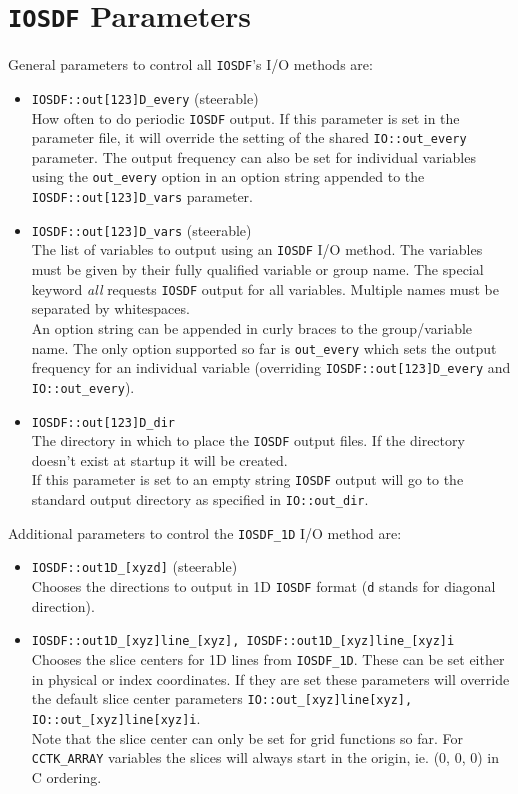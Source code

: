 \documentclass{article}
\begin{document}
\section{{\tt IOSDF} Parameters}
%
General parameters to control all {\tt IOSDF}'s I/O methods are:
\begin{itemize}
  \item {\tt IOSDF::out[123]D\_every} (steerable)\\
        How often to do periodic {\tt IOSDF} output. If this parameter is set in the
        parameter file, it will override the setting of the shared
        {\tt IO::out\_every} parameter. The output frequency can also be set
        for individual variables using the {\tt out\_every} option in an option string appended to the {\tt IOSDF::out[123]D\_vars} parameter.
  \item {\tt IOSDF::out[123]D\_vars} (steerable)\\
        The list of variables to output using an {\tt IOSDF} I/O method.
        The variables must be given by their fully qualified variable or group
        name. The special keyword {\it all} requests {\tt IOSDF} output for
        all variables. Multiple names must be separated by whitespaces.\\
        An option string can be appended in curly braces to the
        group/variable name. The only option supported so far is {\tt out\_every}
        which sets the output frequency for an individual variable (overriding
        {\tt IOSDF::out[123]D\_every} and {\tt IO::out\_every}).
  \item {\tt IOSDF::out[123]D\_dir}\\
        The directory in which to place the {\tt IOSDF} output files.
        If the directory doesn't exist at startup it will be created.\\
        If this parameter is set to an empty string {\tt IOSDF} output will go
        to the standard output directory as specified in {\tt IO::out\_dir}.
\end{itemize}
%
Additional parameters to control the {\tt IOSDF\_1D} I/O method are:
\begin{itemize}
  \item {\tt IOSDF::out1D\_[xyzd]} (steerable)\\
        Chooses the directions to output in 1D {\tt IOSDF} format ({\tt d}
        stands for diagonal direction).
  \item {\tt IOSDF::out1D\_[xyz]line\_[xyz], IOSDF::out1D\_[xyz]line\_[xyz]i}\\
        Chooses the slice centers for 1D lines from {\tt IOSDF\_1D}. These
        can be set either in physical or index coordinates. If they are set
        these parameters will override the default slice center parameters
        {\tt IO::out\_[xyz]line[xyz], IO::out\_[xyz]line[xyz]i}.\\
        Note that the slice center can only be set for grid functions so far.
        For {\tt CCTK\_ARRAY} variables the slices will always start in the
        origin, ie. (0, 0, 0) in C ordering.
\end{itemize}
\end{document}
